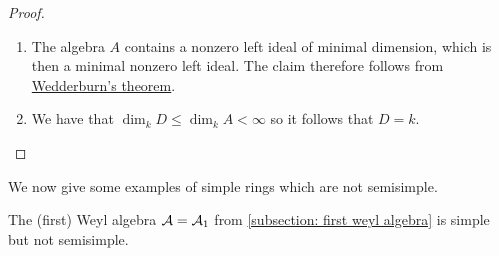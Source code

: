 \begin{proof}
  \leavevmode
  \begin{enumerate}
    \item
      The algebra $A$ contains a nonzero left ideal of minimal dimension, which is then a minimal nonzero left ideal.
      The claim therefore follows from \hyperref[theorem: wedderburns theorem]{Wedderburn’s theorem}.
    \item
      We have that $\dim_k D \leq \dim_k A < \infty$ so it follows that $D = k$.
    \qedhere
  \end{enumerate}
\end{proof}

\begin{fluff}
  We now give some examples of simple rings which are not semisimple.
\end{fluff}


\begin{example}
  \label{example: simple but not semisimple}
  The (first) Weyl algebra $\mathcal{A} = \mathcal{A}_1$ from \ref{subsection: first weyl algebra} is simple but not semisimple.
\end{example}


